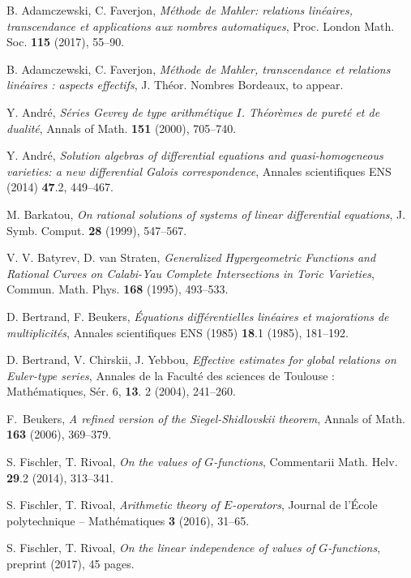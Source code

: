 \documentclass[reqno,english,12pt,a4paper]{smfart}
\numberwithin{equation}{section}
\begin{document}
\begin{thebibliography}{1}\label{sec:biblio}

 B. Adamczewski, C. Faverjon, {\em M\'ethode de Mahler: relations lin\'eaires, transcendance et applications aux nombres automatiques}, Proc. London Math. Soc. {\bf 115} (2017), 55--90. 

 B. Adamczewski, C. Faverjon, {\em M\'ethode de Mahler, transcendance et relations lin\'eaires : aspects effectifs}, J. Th\'eor. Nombres Bordeaux, to appear.


 Y. Andr\'e,  
{\em S\'eries Gevrey de type arithm\'etique $I$.
Th\'eor\`emes de puret\'e et de dualit\'e}, Annals of Math. {\bf 151} (2000),   705--740.

Y. Andr\'e, {\em Solution algebras of differential equations and quasi-homogeneous varieties: a new differential Galois correspondence}, Annales scientifiques ENS (2014) {\bf 47}.2, 449--467.


 M. Barkatou, {\em On rational solutions of systems of linear differential equations}, J. Symb. Comput. {\bf 28} (1999), 547--567.

 V. V.  Batyrev, D. van Straten, {\em Generalized Hypergeometric Functions and Rational
Curves on Calabi-Yau Complete Intersections in Toric Varieties}, Commun. Math. Phys. {\bf 168} (1995), 493--533.

 D. Bertrand, F. Beukers, {\em \'Equations diff\'erentielles lin\'eaires et majorations de multiplicit\'es}, 
Annales scientifiques ENS (1985) {\bf 18}.1 (1985), 181--192.

 D. Bertrand, V. Chirskii, J. Yebbou, 
{\em Effective estimates for global relations on Euler-type series},  
Annales de la Facult\'e des sciences de Toulouse : Math\'ematiques, S\'er. 6, {\bf 13}. 2 (2004),  241--260. 

 F.~Beukers, {\em A refined version of the Siegel-Shidlovskii theorem}, 
Annals of Math. {\bf 163} (2006), 369--379. 

 S. Fischler, T. Rivoal, {\em On the values of $G$-functions}, Commentarii Math. Helv. {\bf 29}.2 (2014), 313--341.


 S. Fischler, T. Rivoal, {\em Arithmetic theory of $E$-operators}, 
Journal de l'\'Ecole polytechnique -- Ma\-th\'e\-ma\-ti\-ques {\bf 3} (2016), 31--65.

  S. Fischler, T. Rivoal, {\em On the linear independence of values of $G$-functions}, preprint (2017), 45 pages.



\end{thebibliography}
\end{document}
